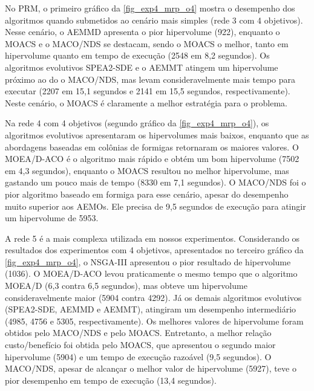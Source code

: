 No PRM, o primeiro gráfico da \autoref{fig_exp4_mrp_o4} mostra o desempenho dos algoritmos quando submetidos ao cenário mais simples (rede 3 com 4 objetivos). Nesse cenário, o AEMMD apresenta o pior hipervolume (922), enquanto o MOACS e o MACO/NDS se destacam, sendo o MOACS o melhor, tanto em hipervolume quanto em tempo de execução (2548 em 8,2 segundos). Os algoritmos evolutivos SPEA2-SDE e o AEMMT atingem um hipervolume próximo ao do o MACO/NDS, mas levam consideravelmente mais tempo para executar (2207 em 15,1 segundos e 2141 em 15,5 segundos, respectivamente). Neste cenário, o MOACS é claramente a melhor estratégia para o problema.

Na rede 4 com 4 objetivos (segundo gráfico da \autoref{fig_exp4_mrp_o4}), os algoritmos evolutivos apresentaram os hipervolumes mais baixos, enquanto que as abordagens baseadas em colônias de formigas retornaram os maiores valores. O MOEA/D-ACO é o algoritmo mais rápido e obtém um bom hipervolume (7502 em 4,3 segundos), enquanto o MOACS resultou no melhor hipervolume, mas gastando um pouco mais de tempo (8330 em 7,1 segundos). O MACO/NDS foi o pior algoritmo baseado em formiga para esse cenário, apesar do desempenho muito superior aos AEMOs. Ele precisa de 9,5 segundos de execução para atingir um hipervolume de 5953.

A rede 5 é a mais complexa utilizada em nossos experimentos. Considerando os resultados dos experimentos com 4 objetivos, apresentados no terceiro gráfico da \autoref{fig_exp4_mrp_o4}, o NSGA-III apresentou o pior resultado de hipervolume (1036). O MOEA/D-ACO levou praticamente o mesmo tempo que o algoritmo MOEA/D (6,3 contra 6,5 segundos), mas obteve um hipervolume consideravelmente maior (5904 contra 4292). Já os demais algoritmos evolutivos (SPEA2-SDE, AEMMD e AEMMT), atingiram um desempenho intermediário (4985, 4756 e 5305, respectivamente). Os melhores valores de hipervolume foram obtidos pelo MACO/NDS e pelo MOACS. Entretanto, a melhor relação custo/benefício foi obtida pelo MOACS, que apresentou o segundo maior hipervolume (5904) e um tempo de execução razoável (9,5 segundos). O MACO/NDS, apesar de alcançar o melhor valor de hipervolume (5927), teve o pior desempenho em tempo de execução (13,4 segundos).

